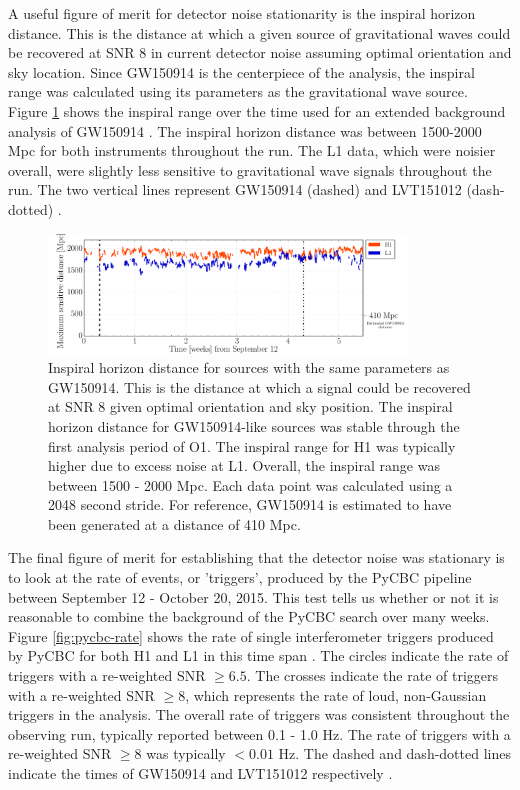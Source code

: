 A useful figure of merit for detector noise stationarity is the
inspiral horizon distance. This is the distance at which a given source
of gravitational waves
could be recovered at SNR 8 in current detector noise assuming
optimal orientation and sky location. Since GW150914 is the
centerpiece of the analysis, the inspiral range was calculated using
its parameters as the gravitational wave source. Figure \ref{fig:inspiral-range}
shows
the inspiral range over the time used for an extended background
analysis of GW150914 \cite{GW150914-DETCHAR}. 
The inspiral horizon distance was between 1500-2000 Mpc
for both instruments throughout the run. The L1 data, which were noisier overall,
were slightly less sensitive to
gravitational wave signals throughout the run. The two vertical lines
represent GW150914 (dashed) and LVT151012 (dash-dotted) \cite{GW150914-DETCHAR}.

\begin{figure}[ht!]%
\includegraphics[width=0.85\textwidth]{figures/O1/inspiral-range}
\caption[Inspiral horizon distance in O1]{Inspiral horizon distance for sources with %
         the same parameters as GW150914. This is the distance at %
         which a signal could be recovered at SNR 8 given optimal %
         orientation and sky position. The inspiral horizon distance for %
         GW150914-like sources was stable through the first analysis %
         period of O1. The inspiral %
         range for H1 was typically higher due to excess noise %
         at L1. Overall, the inspiral range was between 1500 - 2000 Mpc. %
         Each data point was calculated using a 2048 second stride. %
         For reference, GW150914 is estimated to have been generated at a %
         distance of 410 Mpc. %
         }
\label{fig:inspiral-range}
\end{figure}

The final figure of merit for establishing that the detector noise was
stationary is to look at the rate of events, or 'triggers', produced by the PyCBC pipeline
between September 12 - October 20, 2015. This test tells us whether or not it
is reasonable to combine the background of the PyCBC search over many weeks.
Figure \ref{fig:pycbc-rate} shows
the rate of single
interferometer triggers produced by PyCBC for both H1 and L1 in this time
span \cite{GW150914-DETCHAR}. 
The circles indicate the rate of triggers with a re-weighted SNR
$\geq 6.5$. The crosses indicate the rate of triggers with a re-weighted SNR
$\geq 8$, which represents the rate of loud, non-Gaussian triggers in the
analysis. The overall rate of triggers was consistent throughout the
observing run, typically reported between 0.1 - 1.0 Hz. The rate of triggers
with a re-weighted SNR $\geq 8$ was typically $< 0.01$ Hz. The dashed
and dash-dotted lines indicate the times of GW150914 and LVT151012 respectively
\cite{GW150914-DETCHAR}.

